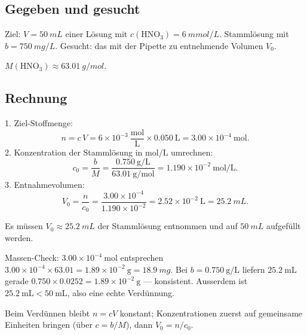
\subsection*{Gegeben und gesucht}
Ziel: $V = \qty{50}{mL}$ einer Lösung mit
$c(\mathrm{HNO_3}) = \qty{6}{mmol/L}$. Stammlösung mit
$b = \qty{750}{mg/L}$. Gesucht: das mit der Pipette zu entnehmende
Volumen $V_0$.

$M(\mathrm{HNO_3}) \approx \qty{63.01}{g/mol}$.

\subsection*{Rechnung}
1. Ziel-Stoffmenge:
\begin{equation}
  n = c\,V = 6\times10^{-3}\ \frac{\mathrm{mol}}{\mathrm{L}}
  \times 0.050\ \mathrm{L} = 3.00\times10^{-4}\ \mathrm{mol}.
\end{equation}
2. Konzentration der Stammlösung in $\mathrm{mol/L}$ umrechnen:
\begin{equation}
  c_0 = \frac{b}{M}
  = \frac{0.750\ \mathrm{g/L}}{63.01\ \mathrm{g/mol}}
  = 1.190\times10^{-2}\ \mathrm{mol/L}.
\end{equation}
3. Entnahmevolumen:
\begin{equation}
  V_0 = \frac{n}{c_0} = \frac{3.00\times10^{-4}}{1.190\times10^{-2}}
  = 2.52\times10^{-2}\ \mathrm{L} = \qty{25.2}{mL}.
\end{equation}

\begin{ergebnis}
Es müssen $V_0 \approx \qty{25.2}{mL}$ der Stammlösung entnommen und auf
$\qty{50}{mL}$ aufgefüllt werden.
\end{ergebnis}

\begin{kontrolle}
Massen-Check: $3.00\times10^{-4}\ \mathrm{mol}$ entsprechen
$3.00\times10^{-4}\times 63.01 = 1.89\times10^{-2}\ \mathrm{g} =
\qty{18.9}{mg}$. Bei $b = 0.750\ \mathrm{g/L}$ liefern
$25.2\ \mathrm{mL}$ gerade $0.750\times 0.0252 = 1.89\times10^{-2}\ \mathrm{g}$
--- konsistent. Ausserdem ist $25.2\ \mathrm{mL} < 50\ \mathrm{mL}$,
also eine echte Verdünnung.
\end{kontrolle}

\begin{merksatz}
Beim Verdünnen bleibt $n = cV$ konstant; Konzentrationen zuerst auf
gemeinsame Einheiten bringen (über $c = b/M$), dann $V_0 = n/c_0$.
\end{merksatz}
